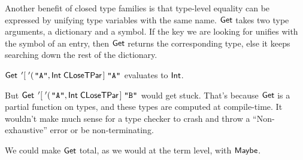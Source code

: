 \resethooks

Another benefit of closed type families is that type-level equality can be
expressed by unifying type variables with the same name.
\ensuremath{\Conid{Get}} takes two type arguments, a dictionary and a symbol.
If the key we are looking for unifies with the symbol of an entry, then
 \ensuremath{\Conid{Get}} returns the corresponding type, else it keeps
 searching down the rest of the dictionary.

\ensuremath{\Conid{Get}\;\thinspace'[\!\;\thinspace'(\!\;\text{\tt \char34 A\char34},\Conid{Int}\;\Conid{CLoseTPar}\;\!]\;\text{\tt \char34 A\char34}} evaluates to
\ensuremath{\Conid{Int}}.

But \ensuremath{\Conid{Get}\;\thinspace'[\!\;\thinspace'(\!\;\text{\tt \char34 A\char34},\Conid{Int}\;\Conid{CLoseTPar}\;\!]\;\text{\tt \char34 B\char34}} would get stuck.
That's because \ensuremath{\Conid{Get}} is a partial function on types,
 and these types are computed at compile-time. It wouldn't make
 much sense for a type checker to crash and throw a ``Non-exhaustive'' error or
 be non-terminating.

We could make \ensuremath{\Conid{Get}} total, as we would at the term level,
 with \ensuremath{\Conid{Maybe}}.

